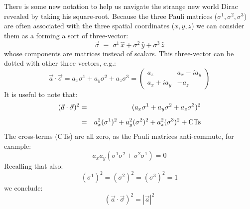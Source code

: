 \documentclass[12pt]{article}
\begin{document}
There is some new notation to help us navigate the strange new world
Dirac revealed by taking his square-root.  Because the three Pauli
matrices ($\sigma^1, \sigma^2, \sigma^3$) are often associated with
the three spatial coordinates ($x, y, z$) we can consider them as a
forming a sort of three-vector:
$$\vec{\sigma} \; \equiv \; \sigma^1 \, \hat{x} + \sigma^2 \, \hat{y} + \sigma^3 \, \hat{z}$$
whose components are matrices instead of scalars.  This three-vector can be dotted with other three vectors, e.g.:
$$\vec{a} \cdot \vec{\sigma} = a_x \sigma^1 + a_y \sigma^2 + a_z \sigma^3
= \begin{pmatrix} a_z & a_x - i a_y \\ a_x + i a_y & -a_z \end{pmatrix}
$$
It is useful to note that:
\begin{eqnarray*}
(\vec{a} \cdot \vec{\sigma})^2 &=& (a_x \sigma^1 + a_y \sigma^2 + a_z \sigma^3)^2\\[5pt]
&=& a_x^2 (\sigma^1)^2 + a_y^2 (\sigma^2)^2 + a_z^2 (\sigma^3)^2 + {\rm CTs}\\
\end{eqnarray*}
The cross-terms (CTs) are all zero, as the Pauli matrices anti-commute, for example:
$$a_x a_y (\sigma^1 \sigma^2 + \sigma^2 \sigma^1) = 0$$
Recalling that also:
$$(\sigma^1)^2 = (\sigma^2)^2 = (\sigma^3)^2 = 1$$
we conclude:
$$(\vec{a}\cdot\vec{\sigma})^2 = |\vec{a}|^2$$
\end{document}
